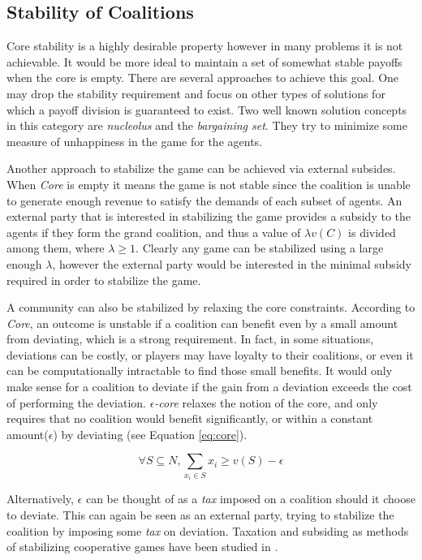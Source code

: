 \subsection{Stability of Coalitions}

Core stability is a highly desirable property however in many problems it is not achievable. It would be more ideal to maintain a set of somewhat stable payoffs when the core is empty. There are several approaches to achieve this goal. One may drop the stability requirement and focus on other types of solutions for which a payoff division is guaranteed to exist. Two well known solution concepts in this category are \emph{nucleolus}\cite{schmeidler_nucleolus_1969} and the \emph{bargaining set}\cite{Davis67existenceof}. They try to minimize some measure of unhappiness in the game for the agents.

Another approach to stabilize the game can be achieved via external subsides. When \emph{Core} is empty it means the game is not stable since the coalition is unable to generate enough revenue to satisfy the demands of each subset of agents. An external party that is interested in stabilizing the game provides a subsidy to the agents if they form the grand coalition, and thus a value of $\lambda v(C)$ is divided among them, where $\lambda \geq 1$. Clearly any game can be stabilized using a large enough $\lambda$, however the external party would be interested in the minimal subsidy required in order to stabilize the game.

A community can also be stabilized by relaxing the core constraints. According to \emph{Core}, an outcome is unstable if a coalition can benefit even by a small amount from deviating, which is a strong requirement. In fact, in some situations, deviations can be costly, or players may have loyalty to their coalitions, or even it can be computationally intractable to find those small benefits. It would only make sense for a coalition to deviate if the gain from a deviation exceeds the cost of performing the deviation. \emph{$\epsilon$-core} relaxes the notion of the core, and only requires that no coalition would benefit significantly, or within a constant amount($\epsilon$) by deviating (see Equation \ref{eq:core}).

   \begin{equation}\label{eq:core2}
       \forall S \subseteq N, \sum_{x_i \in S} x_i \geq v(S) - \epsilon
   \end{equation}

Alternatively, $\epsilon$ can be thought of as a \emph{tax} imposed on a coalition should it choose to deviate. This can again be seen as an external party, trying to stabilize the coalition by imposing some \emph{tax} on deviation. Taxation and subsiding as methods of stabilizing cooperative games have been studied in \cite{RePEc:spr:jogath:v:38:y:2009:i:1:p:3-16, Bachrach:2009:CSC:1692490.1692502, conf/ijcai/MeirRM11}.




